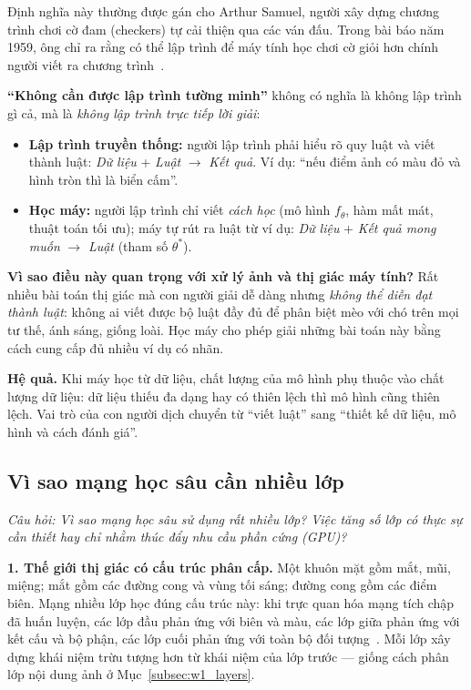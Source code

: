 Định nghĩa này thường được gán cho Arthur Samuel, người xây dựng chương trình chơi cờ đam (checkers) tự cải thiện qua các ván đấu. Trong bài báo năm 1959, ông chỉ ra rằng có thể lập trình để máy tính học chơi cờ giỏi hơn chính người viết ra chương trình~\citep{samuel1959some}.

\textbf{``Không cần được lập trình tường minh''} không có nghĩa là không lập trình gì cả, mà là \emph{không lập trình trực tiếp lời giải}:
\begin{itemize}
    \item \textbf{Lập trình truyền thống:} người lập trình phải hiểu rõ quy luật và viết thành luật: \emph{Dữ liệu} + \emph{Luật} $\rightarrow$ \emph{Kết quả}. Ví dụ: ``nếu điểm ảnh có màu đỏ và hình tròn thì là biển cấm''.
    \item \textbf{Học máy:} người lập trình chỉ viết \emph{cách học} (mô hình $f_\theta$, hàm mất mát, thuật toán tối ưu); máy tự rút ra luật từ ví dụ: \emph{Dữ liệu} + \emph{Kết quả mong muốn} $\rightarrow$ \emph{Luật} (tham số $\theta^*$).
\end{itemize}

\textbf{Vì sao điều này quan trọng với xử lý ảnh và thị giác máy tính?} Rất nhiều bài toán thị giác mà con người giải dễ dàng nhưng \emph{không thể diễn đạt thành luật}: không ai viết được bộ luật đầy đủ để phân biệt mèo với chó trên mọi tư thế, ánh sáng, giống loài. Học máy cho phép giải những bài toán này bằng cách cung cấp đủ nhiều ví dụ có nhãn.

\textbf{Hệ quả.} Khi máy học từ dữ liệu, chất lượng của mô hình phụ thuộc vào chất lượng dữ liệu: dữ liệu thiếu đa dạng hay có thiên lệch thì mô hình cũng thiên lệch. Vai trò của con người dịch chuyển từ ``viết luật'' sang ``thiết kế dữ liệu, mô hình và cách đánh giá''.

\subsection{Vì sao mạng học sâu cần nhiều lớp}
\label{subsec:w2_depth}

\textit{Câu hỏi: Vì sao mạng học sâu sử dụng rất nhiều lớp? Việc tăng số lớp có thực sự cần thiết hay chỉ nhằm thúc đẩy nhu cầu phần cứng (GPU)?}

\textbf{1. Thế giới thị giác có cấu trúc phân cấp.} Một khuôn mặt gồm mắt, mũi, miệng; mắt gồm các đường cong và vùng tối sáng; đường cong gồm các điểm biên. Mạng nhiều lớp học đúng cấu trúc này: khi trực quan hóa mạng tích chập đã huấn luyện, các lớp đầu phản ứng với biên và màu, các lớp giữa phản ứng với kết cấu và bộ phận, các lớp cuối phản ứng với toàn bộ đối tượng~\citep{zeiler2014visualizing}. Mỗi lớp xây dựng khái niệm trừu tượng hơn từ khái niệm của lớp trước — giống cách phân lớp nội dung ảnh ở Mục~\ref{subsec:w1_layers}.

